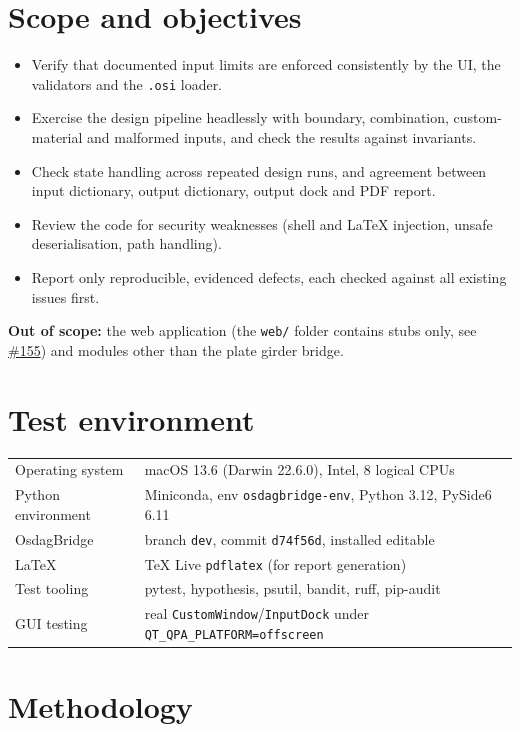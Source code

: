 \documentclass[11pt,a4paper]{article}
\newcommand{\issue}[1]{\href{https://github.com/Nidhikhare12/OsdagBridge/issues/#1}{\##1}}
\begin{document}
\section{Scope and objectives}
\begin{itemize}[nosep]
  \item Verify that documented input limits are enforced consistently by the UI, the validators and the \texttt{.osi} loader.
  \item Exercise the design pipeline headlessly with boundary, combination, custom-material and malformed inputs, and check the results against invariants.
  \item Check state handling across repeated design runs, and agreement between input dictionary, output dictionary, output dock and PDF report.
  \item Review the code for security weaknesses (shell and LaTeX injection, unsafe deserialisation, path handling).
  \item Report only reproducible, evidenced defects, each checked against all existing issues first.
\end{itemize}
\textbf{Out of scope:} the web application (the \texttt{web/} folder contains stubs only, see \issue{155}) and modules other than the plate girder bridge.

\section{Test environment}
\begin{tabular}{@{}ll@{}}
\toprule
Operating system & macOS 13.6 (Darwin 22.6.0), Intel, 8 logical CPUs \\
Python environment & Miniconda, env \texttt{osdagbridge-env}, Python 3.12, PySide6 6.11 \\
OsdagBridge & branch \texttt{dev}, commit \texttt{d74f56d}, installed editable \\
LaTeX & TeX Live \texttt{pdflatex} (for report generation) \\
Test tooling & pytest, hypothesis, psutil, bandit, ruff, pip-audit \\
GUI testing & real \texttt{CustomWindow}/\texttt{InputDock} under \texttt{QT\_QPA\_PLATFORM=offscreen} \\
\bottomrule
\end{tabular}

\section{Methodology}
\end{document}
